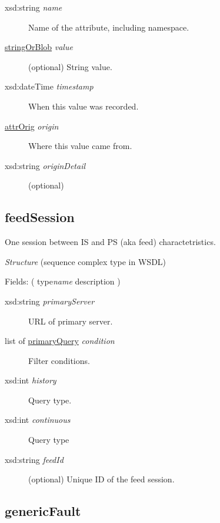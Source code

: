 \begin{description}
\item[{xsd:string {\ttfamily\itshape{{name}}}}]\null{}
Name of the attribute, including namespace.
\item[{\hyperlink{type:stringOrBlob}{stringOrBlob} {\ttfamily\itshape{{value}}}}]\null{}
(optional) String value.
\item[{xsd:dateTime {\ttfamily\itshape{{timestamp}}}}]\null{}
When this value was recorded.
\item[{\hyperlink{type:attrOrig}{attrOrig} {\ttfamily\itshape{{origin}}}}]\null{}
Where this value came from.
\item[{xsd:string {\ttfamily\itshape{{originDetail}}}}]\null{}
(optional)
\end{description}
\noindent \subsection{feedSession}
\label{type:feedSession}\hypertarget{type:feedSession}{}%

One session between IS and PS (aka feed) charactetristics.

{\em{Structure}} (sequence complex type in WSDL)

Fields: ( type{\ttfamily\itshape{{name}}} description )

\begin{description}
\item[{xsd:string {\ttfamily\itshape{{primaryServer}}}}]\null{}
URL of primary server.
\item[{list of \hyperlink{type:primaryQuery}{primaryQuery} {\ttfamily\itshape{{condition}}}}]\null{}
Filter conditions.
\item[{xsd:int {\ttfamily\itshape{{history}}}}]\null{}
Query type.
\item[{xsd:int {\ttfamily\itshape{{continuous}}}}]\null{}
Query type
\item[{xsd:string {\ttfamily\itshape{{feedId}}}}]\null{}
(optional) Unique ID of the feed session.
\end{description}
\noindent \subsection{genericFault}
\label{type:genericFault}\hypertarget{type:genericFault}{}%



